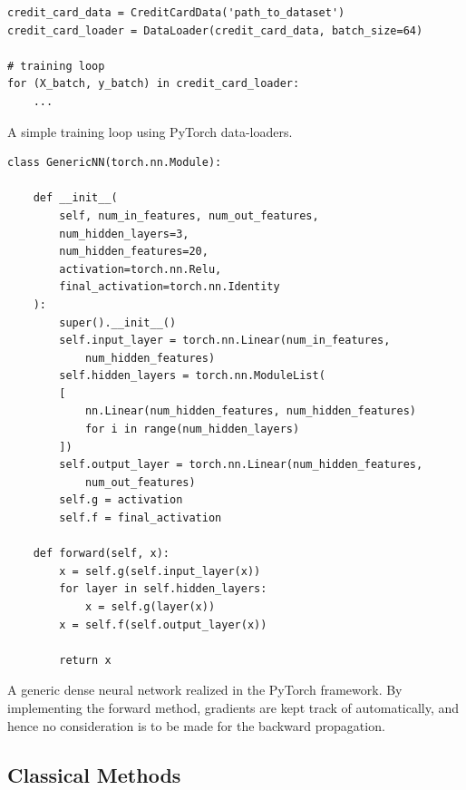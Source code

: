 \documentclass[a4paper, 11pt, oneside, article]{memoir}
\begin{document}
	\begin{listing}
	\begin{verbatim}
credit_card_data = CreditCardData('path_to_dataset')
credit_card_loader = DataLoader(credit_card_data, batch_size=64)

# training loop
for (X_batch, y_batch) in credit_card_loader:
	...
	\end{verbatim}
	\caption{A simple training loop using PyTorch data-loaders.}
	\label{lst:training_loop}
	\end{listing}

	\begin{listing}
	\begin{verbatim}
class GenericNN(torch.nn.Module):

	def __init__(
		self, num_in_features, num_out_features,
		num_hidden_layers=3,
		num_hidden_features=20,
		activation=torch.nn.Relu,
		final_activation=torch.nn.Identity
	):	
		super().__init__()
		self.input_layer = torch.nn.Linear(num_in_features, 
			num_hidden_features)
		self.hidden_layers = torch.nn.ModuleList(
		[
			nn.Linear(num_hidden_features, num_hidden_features)
			for i in range(num_hidden_layers) 
		])
		self.output_layer = torch.nn.Linear(num_hidden_features,
			num_out_features)
		self.g = activation
		self.f = final_activation
	
	def forward(self, x):
		x = self.g(self.input_layer(x))
		for layer in self.hidden_layers:
			x = self.g(layer(x))
		x = self.f(self.output_layer(x))
		
		return x
	\end{verbatim}
	\caption{A generic dense neural network realized in the PyTorch
	framework. By implementing the forward method, gradients are kept track
	of automatically, and hence no consideration is to be made for the backward
	propagation.}
	\label{lst:neural_network}
	\end{listing}

	\subsection{Classical Methods}
\end{document}
